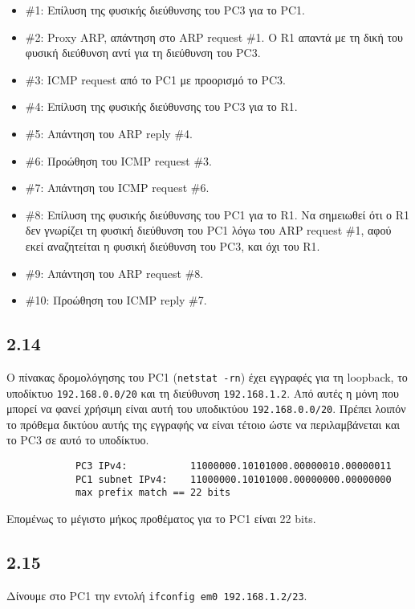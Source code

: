 \documentclass[a4paper, 12pt]{article}
\begin{document}
		\begin{itemize}
			\item \#1: Επίλυση της φυσικής διεύθυνσης του PC3 για το PC1.
			\item \#2: Proxy ARP, απάντηση στο ARP request \#1. Ο R1 απαντά με τη δική του φυσική διεύθυνση αντί για τη διεύθυνση του PC3.
			\item \#3: ICMP request από το PC1 με προορισμό το PC3.
			\item \#4: Επίλυση της φυσικής διεύθυνσης του PC3 για το R1.
			\item \#5: Απάντηση του ARP reply \#4.
			\item \#6: Προώθηση του ICMP request \#3.
			\item \#7: Απάντηση του ICMP request \#6.
			\item \#8: Επίλυση της φυσικής διεύθυνσης του PC1 για το R1. Να σημειωθεί ότι ο R1 δεν γνωρίζει τη φυσική διεύθυνση του PC1 λόγω του ARP request \#1, αφού εκεί αναζητείται η φυσική διεύθυνση του PC3, και όχι του R1.
			\item \#9: Απάντηση του ARP request \#8.
			\item \#10: Προώθηση του ICMP reply \#7.
		\end{itemize}

	\subsection*{2.14}
		Ο πίνακας δρομολόγησης του PC1 (\verb|netstat -rn|) έχει εγγραφές για τη loopback, το υποδίκτυο \verb|192.168.0.0/20| και τη διεύθυνση \verb|192.168.1.2|. Από αυτές η μόνη που μπορεί να φανεί χρήσιμη είναι αυτή του υποδικτύου \verb|192.168.0.0/20|. Πρέπει λοιπόν το πρόθεμα δικτύου αυτής της εγγραφής να είναι τέτοιο ώστε να περιλαμβάνεται και το PC3 σε αυτό το υποδίκτυο. 
		
		\begin{verbatim}
			PC3 IPv4:           11000000.10101000.00000010.00000011
			PC1 subnet IPv4:    11000000.10101000.00000000.00000000
			max prefix match == 22 bits
		\end{verbatim}
		
		Επομένως το μέγιστο μήκος προθέματος για το PC1 είναι 22 bits.

	\subsection*{2.15}
		Δίνουμε στο PC1 την εντολή \verb|ifconfig em0 192.168.1.2/23|.
\end{document}
